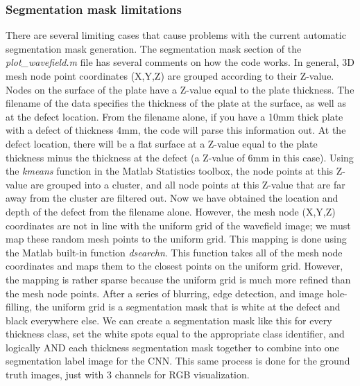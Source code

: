 \documentclass[11pt,letterpaper]{article}
\begin{document}
			\subsubsection*{Segmentation mask limitations}
			There are several limiting cases that cause problems with the current automatic segmentation mask generation. The segmentation mask section of the \textit{plot\_wavefield.m} file has several comments on how the code works. In general, 3D mesh node point coordinates (X,Y,Z) are grouped according to their Z-value. Nodes on the surface of the plate have a Z-value equal to the plate thickness. The filename of the data specifies the thickness of the plate at the surface, as well as at the defect location. From the filename alone, if you have a 10mm thick plate with a defect of thickness 4mm, the code will parse this information out. At the defect location, there will be a flat surface at a Z-value equal to the plate thickness minus the thickness at the defect (a Z-value of 6mm in this case). Using the \textit{kmeans} function in the Matlab Statistics toolbox, the node points at this Z-value are grouped into a cluster, and all node points at this Z-value that are far away from the cluster are filtered out. Now we have obtained the location and depth of the defect from the filename alone. However, the mesh node (X,Y,Z) coordinates are not in line with the uniform grid of the wavefield image; we must map these random mesh points to the uniform grid. This mapping is done using the Matlab built-in function \textit{dsearchn}. This function takes all of the mesh node coordinates and maps them to the closest points on the uniform grid. However, the mapping is rather sparse because the uniform grid is much more refined than the mesh node points. After a series of blurring, edge detection, and image hole-filling, the uniform grid is a segmentation mask that is white at the defect and black everywhere else. We can create a segmentation mask like this for every thickness class, set the white spots equal to the appropriate class identifier, and logically AND each thickness segmentation mask together to combine into one segmentation label image for the CNN. This same process is done for the ground truth images, just with 3 channels for RGB visualization. \bigskip
			
\end{document}
